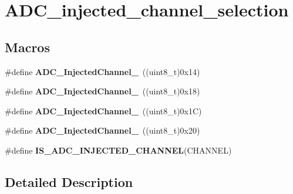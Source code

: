 \hypertarget{group___a_d_c__injected__channel__selection}{\section{A\-D\-C\-\_\-injected\-\_\-channel\-\_\-selection}
\label{group___a_d_c__injected__channel__selection}
}
\subsection*{Macros}
\begin{DoxyCompactItemize}
\item 
\hypertarget{group___a_d_c__injected__channel__selection_ga8792d4ae0fa82dd317252c72815684ba}{\#define {\bfseries A\-D\-C\-\_\-\-Injected\-Channel\-\_}~((uint8\-\_\-t)0x14)}\label{group___a_d_c__injected__channel__selection_ga8792d4ae0fa82dd317252c72815684ba}

\item 
\hypertarget{group___a_d_c__injected__channel__selection_ga2e322fccc7de16a0e79be573f5b1211c}{\#define {\bfseries A\-D\-C\-\_\-\-Injected\-Channel\-\_}~((uint8\-\_\-t)0x18)}\label{group___a_d_c__injected__channel__selection_ga2e322fccc7de16a0e79be573f5b1211c}

\item 
\hypertarget{group___a_d_c__injected__channel__selection_ga6bf03d805645b942bdcc53504e772cf1}{\#define {\bfseries A\-D\-C\-\_\-\-Injected\-Channel\-\_}~((uint8\-\_\-t)0x1\-C)}\label{group___a_d_c__injected__channel__selection_ga6bf03d805645b942bdcc53504e772cf1}

\item 
\hypertarget{group___a_d_c__injected__channel__selection_ga31d18bbcfa7b685e90c3a1313d9c6406}{\#define {\bfseries A\-D\-C\-\_\-\-Injected\-Channel\-\_}~((uint8\-\_\-t)0x20)}\label{group___a_d_c__injected__channel__selection_ga31d18bbcfa7b685e90c3a1313d9c6406}

\item 
\#define {\bfseries I\-S\-\_\-\-A\-D\-C\-\_\-\-I\-N\-J\-E\-C\-T\-E\-D\-\_\-\-C\-H\-A\-N\-N\-E\-L}(C\-H\-A\-N\-N\-E\-L)
\end{DoxyCompactItemize}


\subsection{Detailed Description}


